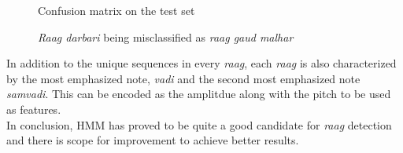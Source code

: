 \documentclass[letterpaper, 10 pt, conference]{ieeeconf}  %
\begin{document}
    \begin{figure}[thpb]
      \centering
      \caption{Confusion matrix on the test set}
      \label{figurelabel}
   \end{figure}
   
         \begin{figure}[thpb]
      \centering
      \caption{\textit{Raag darbari} being misclassified as \textit{raag gaud malhar}}
      \label{figurelabel}
   \end{figure}
   
   
In addition to the unique sequences in every \textit{raag}, each \textit{raag} is also characterized by the most emphasized note, \textit{vadi} and the second most emphasized note \textit{samvadi}. This can be encoded as the amplitdue along with the pitch to be used as features. \\
In conclusion, HMM has proved to be quite a good candidate for \textit{raag} detection and there is scope for improvement to achieve better results. 




\addtolength{\textheight}{-12cm}   %
\end{document}
